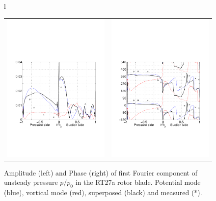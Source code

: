 \begin{figure}
\begin{flushleft}
\begin{tabular}{l}
{\begin{tabular}{ll}
        \hspace{-5mm}
        \includegraphics[width=70mm,clip=t]{CHAP_RT27/FIGURE/amps5m1.pdf}
         &
        \includegraphics[width=70mm,clip=t]{CHAP_RT27/FIGURE/phas5m1.pdf}
       \end{tabular}}
   \end{tabular}
  \end{flushleft}
  \vspace{-8mm}
  \caption{Amplitude (left) and Phase (right) of
           first Fourier component of unsteady pressure $p/p_0$
           in the RT27a rotor blade.
           Potential mode (blue), vortical mode (red),
           superposed (black) and measured (*).}
  \label{rt27_unsteady3d_1.fig}
\end{figure}
